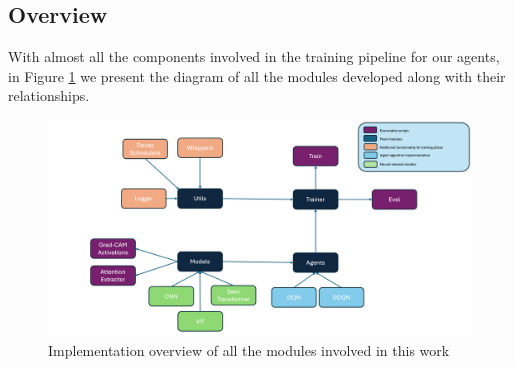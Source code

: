 \subsection{Overview}
\label{sec:overview_implementation}

With almost all the components involved in the training pipeline for our agents, in Figure \ref{fig:implementationoverview} we present the diagram of all the modules developed along with their relationships. 

\begin{figure}[!h]
	\centering
	\includegraphics[width=\linewidth]{figures/implementationoverview}
	\caption{Implementation overview of all the modules involved in this work}
	\label{fig:implementationoverview}
\end{figure}





